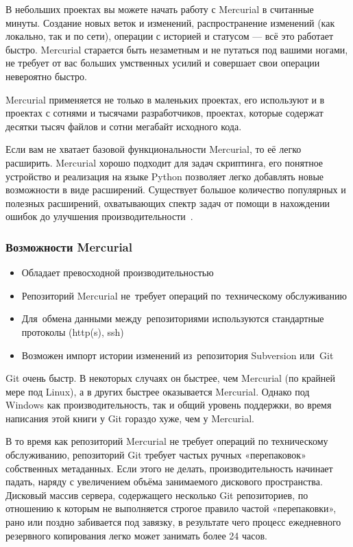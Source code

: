 \documentclass{../industrial-development}
\begin{document}
В небольших проектах вы можете начать работу с Mercurial в считанные минуты. Создание новых веток и изменений, распространение изменений (как локально, так и по сети), операции с историей и статусом — всё это работает быстро. Mercurial старается быть незаметным и не путаться под вашими ногами, не требует от вас больших умственных усилий и совершает свои операции невероятно быстро.

Mercurial применяется не только в маленьких проектах, его используют и в проектах с сотнями и тысячами разработчиков, проектах, которые содержат десятки тысяч файлов и сотни мегабайт исходного кода.

Если вам не хватает базовой функциональности Mercurial, то её легко расширить. Mercurial хорошо подходит для задач скриптинга, его понятное устройство и реализация на языке Python позволяет легко добавлять новые возможности в виде расширений. Существует большое количество популярных и полезных расширений, охватывающих спектр задач от помощи в нахождении ошибок до улучшения производительности~\cite[с.~6--7]{MercurialOReilly}.

\begin{frame} \frametitle{Возможности Mercurial}
  
  \begin{itemize}
  \item Обладает превосходной производительностью
  \item Репозиторий Mercurial не~требует операций по~техническому обслуживанию
  \item Для~обмена данными между~репозиториями используются стандартные протоколы (http(s), ssh)
  \item Возможен импорт истории изменений из~репозитория Subversion или~Git
  \end{itemize}
\end{frame}

\lecturenotes

Git очень быстр. В некоторых случаях он быстрее, чем Mercurial (по крайней мере под Linux), а в других быстрее оказывается Mercurial. Однако под Windows как производительность, так и общий уровень поддержки, во время написания этой книги у Git гораздо хуже, чем у Mercurial.

В то время как репозиторий Mercurial не требует операций по техническому обслуживанию, репозиторий Git требует частых ручных «перепаковок» собственных метаданных. Если этого не делать, производительность начинает падать, наряду с увеличением объёма занимаемого дискового пространства. Дисковый массив сервера, содержащего несколько Git репозиториев, по отношению к которым не выполняется строгое правило частой «перепаковки», рано или поздно забивается под завязку, в результате чего процесс ежедневного резервного копирования легко может занимать более 24 часов. 
\end{document}
